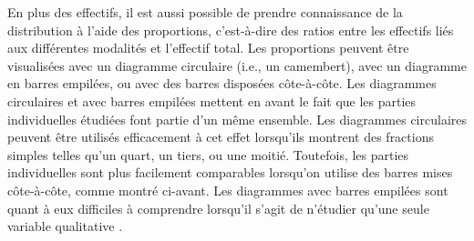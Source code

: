 \documentclass[
  french,
]{book}
\begin{document}
En plus des effectifs, il est aussi possible de prendre connaissance de la distribution à l'aide des proportions, c'est-à-dire des ratios entre les effectifs liés aux différentes modalités et l'effectif total. Les proportions peuvent être visualisées avec un diagramme circulaire (i.e., un camembert), avec un diagramme en barres empilées, ou avec des barres disposées côte-à-côte. Les diagrammes circulaires et avec barres empilées mettent en avant le fait que les parties individuelles étudiées font partie d'un même ensemble. Les diagrammes circulaires peuvent être utilisés efficacement à cet effet lorsqu'ils montrent des fractions simples telles qu'un quart, un tiers, ou une moitié. Toutefois, les parties individuelles sont plus facilement comparables lorsqu'on utilise des barres mises côte-à-côte, comme montré ci-avant. Les diagrammes avec barres empilées sont quant à eux difficiles à comprendre lorsqu'il s'agit de n'étudier qu'une seule variable qualitative \autocite{wilkeFundamentalsDataVisualization2018}.
\end{document}
